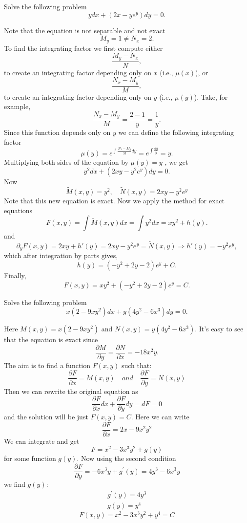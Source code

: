 \documentclass[11pt]{article}
\begin{document}
\begin{problem}
Solve the following problem
\begin{equation*}
ydx + (2x - y e^{y}) dy = 0.
\end{equation*}
\end{problem}
\begin{solution}
Note that the equation is not separable and not exact
\[M _{y} = 1 \neq N_{ x} = 2 .\]
To find the integrating factor we first compute either
\[\frac {M_{ y} - N_{ x}} {N} ,\]
to create an integrating factor depending only on $x$ (i.e., $\mu( x )$), or
\[\frac{N_{ x} - M_{ y}}{ M} ,\]
to create an integrating factor depending only on $y$ (i.e., $\mu ( y )$).
Take, for example,
\[\frac{N_{ x} - M_{ y}}{ M} = \frac{2 - 1}{ y} = \frac{1}{y}.\]
Since this function depends only on $y$ we can define the following integrating factor 
\[\mu( y ) = e^{ \int \frac{N_{ x} - M_{ y}}{ M} dy }= e^{ \int \frac{ dy}{ y}} = y.\]
Multiplying both sides of the equation by $\mu ( y ) = y$ , we get
\[y^{ 2} dx + (2 xy - y^{ 2} e^{ y} ) dy = 0 .\]
Now
\[ \tilde{M}(x, y) = y^2, \quad \tilde{N}(x, y) = 2 xy - y^{ 2} e^{ y} \]
Note that this new equation is exact.  Now we apply the method for exact equations
\[F ( x,y ) = \int \tilde{M} ( x,y ) dx = \int y^{ 2} dx = xy^2 + h ( y ) .\]
and
\[\partial_{ y} F ( x,y ) = 2 xy + h'( y ) = 2 xy - y^{ 2} e^{ y} = \tilde{N} ( x,y ) \Rightarrow h'( y ) = - y^{ 2} e^{ y} ,\]
which after integration by parts gives,
\[ h ( y ) = ( - y^{ 2} + 2 y - 2) e^{y} +C.\]
Finally,
\[\boxed{F ( x,y ) = xy^{ 2} + ( - y^{ 2} + 2 y - 2) e^{ y} = C }.\]
\end{solution}



\begin{problem}
Solve the following problem
\begin{equation*}
  x \left( 2 - 9xy^2 \right)dx + y(4y^2 - 6x^3) dy = 0.
\end{equation*}
\end{problem}
\begin{solution}
  Here $M(x, y) = x \left( 2 - 9xy^2 \right)$ and $N(x, y) = y(4y^2 - 6x^3)$.
  It's easy to see that the equation is exact since
  \[ \frac {\partial M} {\partial y} = \frac {\partial N} {\partial x}
    = - 18 x^2 y. \]
  The aim is to find a function $F(x, y)$ such that:
  \[ \frac {\partial F} {\partial x} = M(x, y) \quad and \quad
    \frac {\partial F} {\partial y} = N(x, y) \]
  Then we can rewrite the original equation as
  \[ \frac {\partial F} {\partial x} dx + \frac {\partial F} {\partial y} dy
    = d F = 0 \]
  and the solution will be just $F(x, y) = C$.
  Here we can write
  \[ \frac {\partial F} {\partial x} = 2x - 9x^2y^2 \]
  We can integrate and get
  \[ F = x^2 - 3 x^3 y^2 + g(y) \]
  for some function $g(y)$. Now using the second condition
  \[ \frac {\partial F} {\partial y} = -6x^3y + g^{\prime}(y) = 4y^3 - 6x^3y \]
  we find $g(y)$:
  \begin{eqnarray*}
    g^{\prime}(y) = 4y^3 \\
    g(y) = y^4
  \end{eqnarray*}
 \[ \boxed{F(x, y) = x^2 - 3 x^3 y^2 + y^4 = C} \]  
\end{solution}
\end{document}
